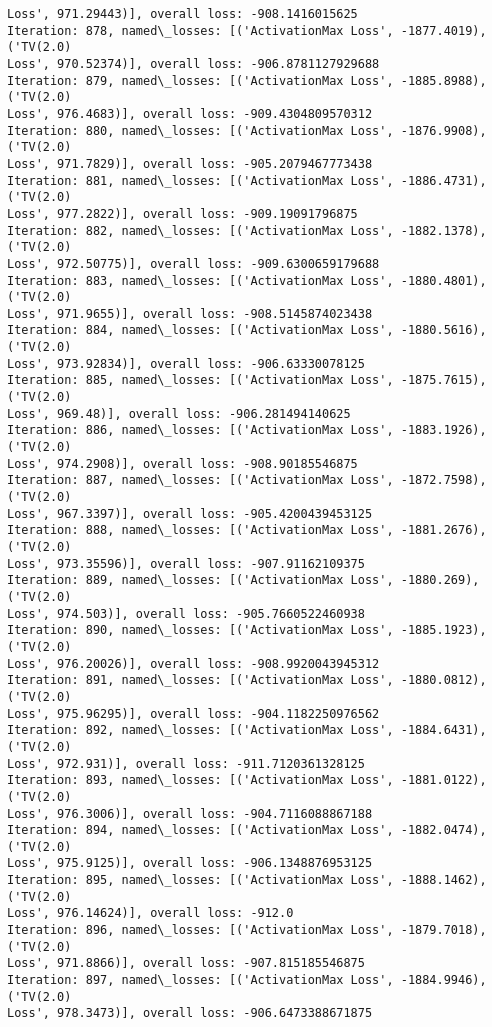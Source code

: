 \documentclass[10pt]{article}
\begin{document}
\begin{Verbatim}[commandchars=\\\{\}]
Loss', 971.29443)], overall loss: -908.1416015625
Iteration: 878, named\_losses: [('ActivationMax Loss', -1877.4019), ('TV(2.0)
Loss', 970.52374)], overall loss: -906.8781127929688
Iteration: 879, named\_losses: [('ActivationMax Loss', -1885.8988), ('TV(2.0)
Loss', 976.4683)], overall loss: -909.4304809570312
Iteration: 880, named\_losses: [('ActivationMax Loss', -1876.9908), ('TV(2.0)
Loss', 971.7829)], overall loss: -905.2079467773438
Iteration: 881, named\_losses: [('ActivationMax Loss', -1886.4731), ('TV(2.0)
Loss', 977.2822)], overall loss: -909.19091796875
Iteration: 882, named\_losses: [('ActivationMax Loss', -1882.1378), ('TV(2.0)
Loss', 972.50775)], overall loss: -909.6300659179688
Iteration: 883, named\_losses: [('ActivationMax Loss', -1880.4801), ('TV(2.0)
Loss', 971.9655)], overall loss: -908.5145874023438
Iteration: 884, named\_losses: [('ActivationMax Loss', -1880.5616), ('TV(2.0)
Loss', 973.92834)], overall loss: -906.63330078125
Iteration: 885, named\_losses: [('ActivationMax Loss', -1875.7615), ('TV(2.0)
Loss', 969.48)], overall loss: -906.281494140625
Iteration: 886, named\_losses: [('ActivationMax Loss', -1883.1926), ('TV(2.0)
Loss', 974.2908)], overall loss: -908.90185546875
Iteration: 887, named\_losses: [('ActivationMax Loss', -1872.7598), ('TV(2.0)
Loss', 967.3397)], overall loss: -905.4200439453125
Iteration: 888, named\_losses: [('ActivationMax Loss', -1881.2676), ('TV(2.0)
Loss', 973.35596)], overall loss: -907.91162109375
Iteration: 889, named\_losses: [('ActivationMax Loss', -1880.269), ('TV(2.0)
Loss', 974.503)], overall loss: -905.7660522460938
Iteration: 890, named\_losses: [('ActivationMax Loss', -1885.1923), ('TV(2.0)
Loss', 976.20026)], overall loss: -908.9920043945312
Iteration: 891, named\_losses: [('ActivationMax Loss', -1880.0812), ('TV(2.0)
Loss', 975.96295)], overall loss: -904.1182250976562
Iteration: 892, named\_losses: [('ActivationMax Loss', -1884.6431), ('TV(2.0)
Loss', 972.931)], overall loss: -911.7120361328125
Iteration: 893, named\_losses: [('ActivationMax Loss', -1881.0122), ('TV(2.0)
Loss', 976.3006)], overall loss: -904.7116088867188
Iteration: 894, named\_losses: [('ActivationMax Loss', -1882.0474), ('TV(2.0)
Loss', 975.9125)], overall loss: -906.1348876953125
Iteration: 895, named\_losses: [('ActivationMax Loss', -1888.1462), ('TV(2.0)
Loss', 976.14624)], overall loss: -912.0
Iteration: 896, named\_losses: [('ActivationMax Loss', -1879.7018), ('TV(2.0)
Loss', 971.8866)], overall loss: -907.815185546875
Iteration: 897, named\_losses: [('ActivationMax Loss', -1884.9946), ('TV(2.0)
Loss', 978.3473)], overall loss: -906.6473388671875

\end{Verbatim}
\end{document}
